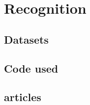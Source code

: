\documentclass[Report.tex]{subfiles}
\begin{document}
\chapter{Recognition}
\label{sec:Recognition}
\section{Datasets}
\section{Code used}
\section{articles}


\end{document}
